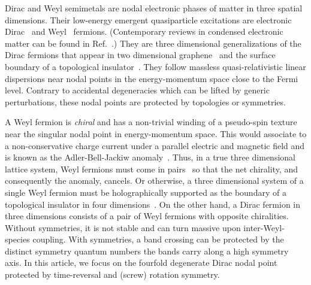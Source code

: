 Dirac and Weyl semimetals are nodal electronic phases of matter in three spatial dimensions. Their low-energy emergent quasiparticle excitations are electronic Dirac~\cite{Dirac28} and Weyl~\cite{Weyl29} fermions. (Contemporary reviews in condensed electronic matter can be found in Ref.~.) They are three dimensional generalizations of the Dirac fermions that appear in two dimensional graphene~\cite{NetoGuineaPeresNovoselovGeim09} and the surface boundary of a topological insulator~\cite{HasanKane10,QiZhangreview11,HasanMoore11,RMP}. They follow massless quasi-relativistic linear dispersions near nodal points in the energy-momentum space close to the Fermi level. Contrary to accidental degeneracies which can be lifted by generic perturbations, these nodal points are protected by topologies or symmetries. 

A Weyl fermion is {\em chiral} and has a non-trivial winding of a pseudo-spin texture near the singular nodal point in energy-momentum space. This would associate to a non-conservative charge current under a parallel electric and magnetic field and is known as the Adler-Bell-Jackiw anomaly~\cite{Adler69,BellJackiw69}. Thus, in a true three dimensional lattice system, Weyl fermions must come in pairs~\cite{Nielsen_Ninomiya_1981,NielsenNinomiyaPLB1981,NielsenNinomiya83} so that the net chirality, and consequently the anomaly, cancels. Or otherwise, a three dimensional system of a single Weyl fermion must be holographically supported as the boundary of a topological insulator in four dimensions~\cite{ZhangHu01,BernevigChernHuToumbasZhang02,QiHughesZhang08}. On the other hand, a Dirac fermion in three dimensions consists of a pair of Weyl fermions with opposite chiralities. Without symmetries, it is not stable and can turn massive upon inter-Weyl-species coupling. With symmetries, a band crossing can be protected by the distinct symmetry quantum numbers the bands carry along a high symmetry axis. In this article, we focus on the fourfold degenerate Dirac nodal point protected by time-reversal and (screw) rotation symmetry.

